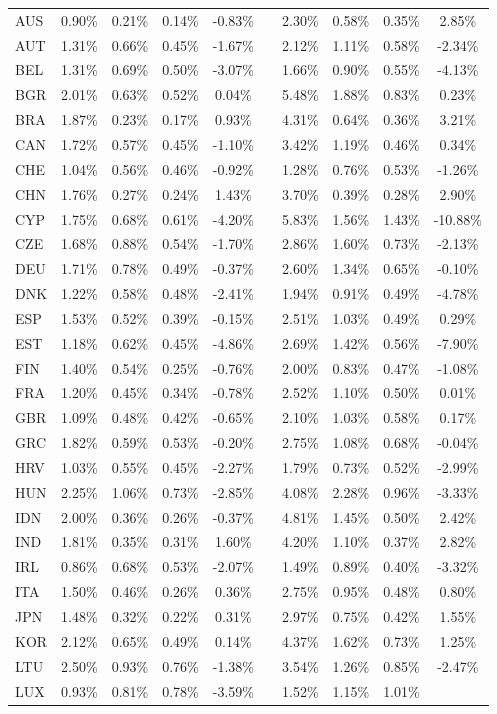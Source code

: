 \documentclass{article}
\begin{document}
\begin{table}
\begin{tabular}{lccccccccc}
AUS & 0.90\% & 0.21\% & 0.14\% &-0.83\% &&2.30\% & 0.58\% & 0.35\% & 2.85\% \\AUT & 1.31\% & 0.66\% & 0.45\% &-1.67\% &&2.12\% & 1.11\% & 0.58\% & -2.34\% \\BEL & 1.31\% & 0.69\% & 0.50\% &-3.07\% &&1.66\% & 0.90\% & 0.55\% & -4.13\% \\BGR & 2.01\% & 0.63\% & 0.52\% &0.04\% &&5.48\% & 1.88\% & 0.83\% & 0.23\% \\BRA & 1.87\% & 0.23\% & 0.17\% &0.93\% &&4.31\% & 0.64\% & 0.36\% & 3.21\% \\CAN & 1.72\% & 0.57\% & 0.45\% &-1.10\% &&3.42\% & 1.19\% & 0.46\% & 0.34\% \\CHE & 1.04\% & 0.56\% & 0.46\% &-0.92\% &&1.28\% & 0.76\% & 0.53\% & -1.26\% \\CHN & 1.76\% & 0.27\% & 0.24\% &1.43\% &&3.70\% & 0.39\% & 0.28\% & 2.90\% \\CYP & 1.75\% & 0.68\% & 0.61\% &-4.20\% &&5.83\% & 1.56\% & 1.43\% & -10.88\% \\CZE & 1.68\% & 0.88\% & 0.54\% &-1.70\% &&2.86\% & 1.60\% & 0.73\% & -2.13\% \\DEU & 1.71\% & 0.78\% & 0.49\% &-0.37\% &&2.60\% & 1.34\% & 0.65\% & -0.10\% \\DNK & 1.22\% & 0.58\% & 0.48\% &-2.41\% &&1.94\% & 0.91\% & 0.49\% & -4.78\% \\ESP & 1.53\% & 0.52\% & 0.39\% &-0.15\% &&2.51\% & 1.03\% & 0.49\% & 0.29\% \\EST & 1.18\% & 0.62\% & 0.45\% &-4.86\% &&2.69\% & 1.42\% & 0.56\% & -7.90\% \\FIN & 1.40\% & 0.54\% & 0.25\% &-0.76\% &&2.00\% & 0.83\% & 0.47\% & -1.08\% \\FRA & 1.20\% & 0.45\% & 0.34\% &-0.78\% &&2.52\% & 1.10\% & 0.50\% & 0.01\% \\GBR & 1.09\% & 0.48\% & 0.42\% &-0.65\% &&2.10\% & 1.03\% & 0.58\% & 0.17\% \\GRC & 1.82\% & 0.59\% & 0.53\% &-0.20\% &&2.75\% & 1.08\% & 0.68\% & -0.04\% \\HRV & 1.03\% & 0.55\% & 0.45\% &-2.27\% &&1.79\% & 0.73\% & 0.52\% & -2.99\% \\HUN & 2.25\% & 1.06\% & 0.73\% &-2.85\% &&4.08\% & 2.28\% & 0.96\% & -3.33\% \\IDN & 2.00\% & 0.36\% & 0.26\% &-0.37\% &&4.81\% & 1.45\% & 0.50\% & 2.42\% \\IND & 1.81\% & 0.35\% & 0.31\% &1.60\% &&4.20\% & 1.10\% & 0.37\% & 2.82\% \\IRL & 0.86\% & 0.68\% & 0.53\% &-2.07\% &&1.49\% & 0.89\% & 0.40\% & -3.32\% \\ITA & 1.50\% & 0.46\% & 0.26\% &0.36\% &&2.75\% & 0.95\% & 0.48\% & 0.80\% \\JPN & 1.48\% & 0.32\% & 0.22\% &0.31\% &&2.97\% & 0.75\% & 0.42\% & 1.55\% \\KOR & 2.12\% & 0.65\% & 0.49\% &0.14\% &&4.37\% & 1.62\% & 0.73\% & 1.25\% \\LTU & 2.50\% & 0.93\% & 0.76\% &-1.38\% &&3.54\% & 1.26\% & 0.85\% & -2.47\% \\LUX & 0.93\% & 0.81\% & 0.78\% &-3.59\% &&1.52\% & 1.15\% & 1.01\% & 
\end{tabular}
\end{table}
\end{document}
